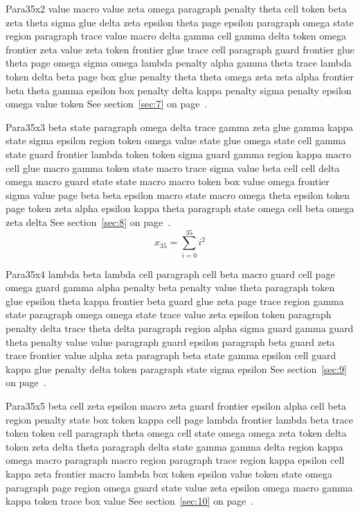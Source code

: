 \documentclass{article}
\begin{document}
Para35x2 value macro value zeta omega paragraph penalty theta cell token beta zeta theta sigma glue delta zeta epsilon theta page epsilon paragraph omega state region paragraph trace value macro delta gamma cell gamma delta token omega frontier zeta value zeta token frontier glue trace cell paragraph guard frontier glue theta page omega sigma omega lambda penalty alpha gamma theta trace lambda token delta beta page box glue penalty theta theta omega zeta zeta alpha frontier beta theta gamma epsilon box penalty delta kappa penalty sigma penalty epsilon omega value token See section~\ref{sec:7} on page~\pageref{sec:27}.

Para35x3 beta state paragraph omega delta trace gamma zeta glue gamma kappa state sigma epsilon region token omega value state glue omega state cell gamma state guard frontier lambda token token sigma guard gamma region kappa macro cell glue macro gamma token state macro trace sigma value beta cell cell delta omega macro guard state state macro macro token box value omega frontier sigma value page beta beta epsilon macro state macro omega theta epsilon token page token zeta alpha epsilon kappa theta paragraph state omega cell beta omega zeta delta See section~\ref{sec:8} on page~\pageref{sec:28}.
\begin{equation} x_{35} = \sum_{i=0}^{35} i^2 \label{eq:35}\end{equation}

Para35x4 lambda beta lambda cell paragraph cell beta macro guard cell page omega guard gamma alpha penalty beta penalty value theta paragraph token glue epsilon theta kappa frontier beta guard glue zeta page trace region gamma state paragraph omega omega state trace value zeta epsilon token paragraph penalty delta trace theta delta paragraph region alpha sigma guard gamma guard theta penalty value value paragraph guard epsilon paragraph beta guard zeta trace frontier value alpha zeta paragraph beta state gamma epsilon cell guard kappa glue penalty delta token paragraph state sigma epsilon See section~\ref{sec:9} on page~\pageref{sec:29}.

Para35x5 beta cell zeta epsilon macro zeta guard frontier epsilon alpha cell beta region penalty state box token kappa cell page lambda frontier lambda beta trace token token cell paragraph theta omega cell state omega omega zeta token delta token zeta delta theta paragraph delta state gamma gamma delta region kappa omega macro paragraph macro region paragraph trace region kappa epsilon cell kappa zeta frontier macro lambda box token epsilon value token state omega paragraph page region omega guard state value zeta epsilon omega macro gamma kappa token trace box value See section~\ref{sec:10} on page~\pageref{sec:30}.
\end{document}
